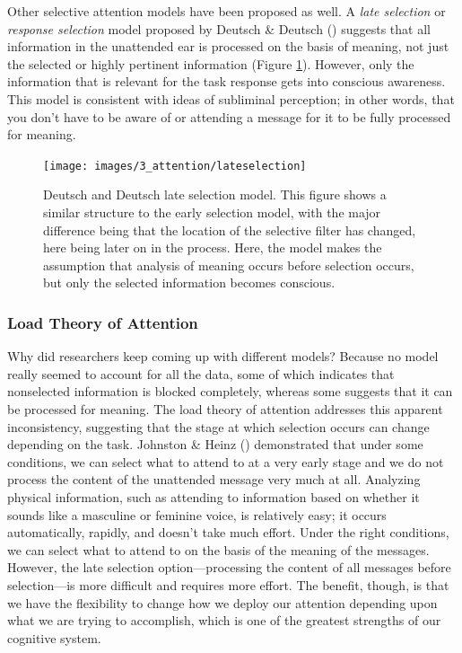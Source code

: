 \documentclass[
]{krantz}
\begin{document}
Other selective attention models have been proposed as well. A \emph{late selection} or \emph{response selection} model proposed by Deutsch \& Deutsch () suggests that all information in the unattended ear is processed on the basis of meaning, not just the selected or highly pertinent information (Figure \ref{fig:lateselection}). However, only the information that is relevant for the task response gets into conscious awareness. This model is consistent with ideas of subliminal perception; in other words, that you don't have to be aware of or attending a message for it to be fully processed for meaning.

\begin{figure}

{\centering \texttt{[image: images/3\_attention/lateselection]} 

}

\caption{Deutsch and Deutsch late selection model. This figure shows a similar structure to the early selection model, with the major difference being that the location of the selective filter has changed, here being later on in the process. Here, the model makes the assumption that analysis of meaning occurs before selection occurs, but only the selected information becomes conscious.}\label{fig:lateselection}
\end{figure}

\subsubsection*{Load Theory of Attention}\label{load-theory-of-attention}


Why did researchers keep coming up with different models? Because no model really seemed to account for all the data, some of which indicates that nonselected information is blocked completely, whereas some suggests that it can be processed for meaning. The load theory of attention addresses this apparent inconsistency, suggesting that the stage at which selection occurs can change depending on the task. Johnston \& Heinz () demonstrated that under some conditions, we can select what to attend to at a very early stage and we do not process the content of the unattended message very much at all. Analyzing physical information, such as attending to information based on whether it sounds like a masculine or feminine voice, is relatively easy; it occurs automatically, rapidly, and doesn't take much effort. Under the right conditions, we can select what to attend to on the basis of the meaning of the messages. However, the late selection option---processing the content of all messages before selection---is more difficult and requires more effort. The benefit, though, is that we have the flexibility to change how we deploy our attention depending upon what we are trying to accomplish, which is one of the greatest strengths of our cognitive system.
\end{document}
